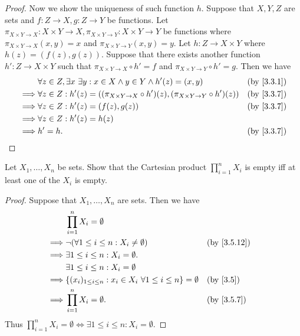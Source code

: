 \begin{proof}
	Now we show the uniqueness of such function \(h\).
	Suppose that \(X, Y, Z\) are sets and \(f : Z \to X, g : Z \to Y\) be functions.
	Let \(\pi_{X \times Y \to X} : X \times Y \to X, \pi_{X \times Y \to Y} : X \times Y \to Y\) be functions where \(\pi_{X \times Y \to X}(x, y) = x\) and \(\pi_{X \times Y \to Y}(x, y) = y\).
	Let \(h : Z \to X \times Y\) where \(h(z) = (f(z), g(z))\).
	Suppose that there exists another function \(h' : Z \to X \times Y\) such that \(\pi_{X \times Y \to X} \circ h' = f\) and \(\pi_{X \times Y \to Y} \circ h' = g\).
	Then we have
	\begin{align*}
		         & \forall z \in Z, \exists x \ \exists y : x \in X \land y \in Y \land h'(z) = (x, y)                    &  & \by{3.3.1} \\
		\implies & \forall z \in Z : h'(z) = ((\pi_{X \times Y \to X} \circ h')(z), (\pi_{X \times Y \to Y} \circ h')(z)) &  & \by{3.3.7} \\
		\implies & \forall z \in Z : h'(z) = (f(z), g(z))                                                                 &  & \by{3.3.7} \\
		\implies & \forall z \in Z : h'(z) = h(z)                                                                                         \\
		\implies & h' = h.                                                                                                &  & \by{3.3.7}
	\end{align*}
\end{proof}

\begin{ex}\label{ex:3.5.8}
	Let \(X_1, \dots, X_n\) be sets.
	Show that the Cartesian product \(\prod_{i = 1}^n X_i\) is empty iff at least one of the \(X_i\) is empty.
\end{ex}

\begin{proof}
	Suppose that \(X_1, \dots, X_n\) are sets.
	Then we have
	\begin{align*}
		         & \prod_{i = 1}^n X_i = \emptyset                                                                    \\
		\implies & \lnot (\forall 1 \leq i \leq n : X_i \neq \emptyset)                              &  & \by{3.5.12} \\
		\implies & \exists 1 \leq i \leq n : X_i = \emptyset.                                                         \\
		         & \exists 1 \leq i \leq n : X_i = \emptyset                                                          \\
		\implies & \set{(x_i)_{1 \leq i \leq n} : x_i \in X_i \ \forall 1 \leq i \leq n} = \emptyset &  & \by{3.5}    \\
		\implies & \prod_{i = 1}^n X_i = \emptyset.                                                  &  & \by{3.5.7}
	\end{align*}
	Thus \(\prod_{i = 1}^n X_i = \emptyset \iff \exists 1 \leq i \leq n : X_i = \emptyset\).
\end{proof}

